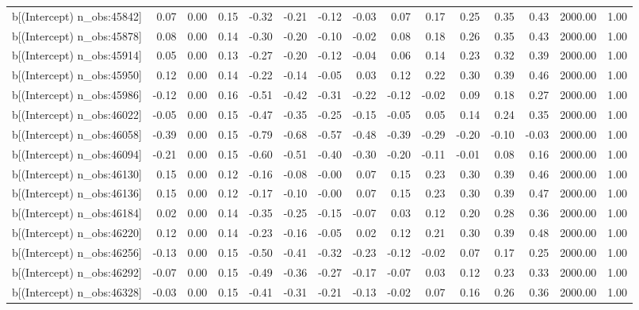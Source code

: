 \begin{table}[ht]
\begin{tabular}{rrrrrrrrrrrrrrr}
  b[(Intercept) n\_obs:45842] & 0.07 & 0.00 & 0.15 & -0.32 & -0.21 & -0.12 & -0.03 & 0.07 & 0.17 & 0.25 & 0.35 & 0.43 & 2000.00 & 1.00 \\ 
  b[(Intercept) n\_obs:45878] & 0.08 & 0.00 & 0.14 & -0.30 & -0.20 & -0.10 & -0.02 & 0.08 & 0.18 & 0.26 & 0.35 & 0.43 & 2000.00 & 1.00 \\ 
  b[(Intercept) n\_obs:45914] & 0.05 & 0.00 & 0.13 & -0.27 & -0.20 & -0.12 & -0.04 & 0.06 & 0.14 & 0.23 & 0.32 & 0.39 & 2000.00 & 1.00 \\ 
  b[(Intercept) n\_obs:45950] & 0.12 & 0.00 & 0.14 & -0.22 & -0.14 & -0.05 & 0.03 & 0.12 & 0.22 & 0.30 & 0.39 & 0.46 & 2000.00 & 1.00 \\ 
  b[(Intercept) n\_obs:45986] & -0.12 & 0.00 & 0.16 & -0.51 & -0.42 & -0.31 & -0.22 & -0.12 & -0.02 & 0.09 & 0.18 & 0.27 & 2000.00 & 1.00 \\ 
  b[(Intercept) n\_obs:46022] & -0.05 & 0.00 & 0.15 & -0.47 & -0.35 & -0.25 & -0.15 & -0.05 & 0.05 & 0.14 & 0.24 & 0.35 & 2000.00 & 1.00 \\ 
  b[(Intercept) n\_obs:46058] & -0.39 & 0.00 & 0.15 & -0.79 & -0.68 & -0.57 & -0.48 & -0.39 & -0.29 & -0.20 & -0.10 & -0.03 & 2000.00 & 1.00 \\ 
  b[(Intercept) n\_obs:46094] & -0.21 & 0.00 & 0.15 & -0.60 & -0.51 & -0.40 & -0.30 & -0.20 & -0.11 & -0.01 & 0.08 & 0.16 & 2000.00 & 1.00 \\ 
  b[(Intercept) n\_obs:46130] & 0.15 & 0.00 & 0.12 & -0.16 & -0.08 & -0.00 & 0.07 & 0.15 & 0.23 & 0.30 & 0.39 & 0.46 & 2000.00 & 1.00 \\ 
  b[(Intercept) n\_obs:46136] & 0.15 & 0.00 & 0.12 & -0.17 & -0.10 & -0.00 & 0.07 & 0.15 & 0.23 & 0.30 & 0.39 & 0.47 & 2000.00 & 1.00 \\ 
  b[(Intercept) n\_obs:46184] & 0.02 & 0.00 & 0.14 & -0.35 & -0.25 & -0.15 & -0.07 & 0.03 & 0.12 & 0.20 & 0.28 & 0.36 & 2000.00 & 1.00 \\ 
  b[(Intercept) n\_obs:46220] & 0.12 & 0.00 & 0.14 & -0.23 & -0.16 & -0.05 & 0.02 & 0.12 & 0.21 & 0.30 & 0.39 & 0.48 & 2000.00 & 1.00 \\ 
  b[(Intercept) n\_obs:46256] & -0.13 & 0.00 & 0.15 & -0.50 & -0.41 & -0.32 & -0.23 & -0.12 & -0.02 & 0.07 & 0.17 & 0.25 & 2000.00 & 1.00 \\ 
  b[(Intercept) n\_obs:46292] & -0.07 & 0.00 & 0.15 & -0.49 & -0.36 & -0.27 & -0.17 & -0.07 & 0.03 & 0.12 & 0.23 & 0.33 & 2000.00 & 1.00 \\ 
  b[(Intercept) n\_obs:46328] & -0.03 & 0.00 & 0.15 & -0.41 & -0.31 & -0.21 & -0.13 & -0.02 & 0.07 & 0.16 & 0.26 & 0.36 & 2000.00 & 1.00 \\ 

\end{tabular}
\end{table}
